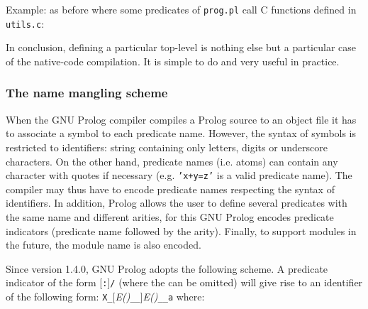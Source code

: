 Example: as before where some predicates of \texttt{prog.pl} call C functions
defined in \texttt{utils.c}:


In conclusion, defining a particular top-level is nothing else but a
particular case of the native-code compilation. It is simple to do and very
useful in practice.

\subsubsection{The name mangling scheme}
\label{Name-mangling-scheme}

When the GNU Prolog compiler compiles a Prolog source to an object file it
has to associate a symbol to each predicate name. However, the syntax of
symbols is restricted to identifiers: string containing only letters, digits
or underscore characters. On the other hand, predicate names (i.e. atoms) can
contain any character with quotes if necessary (e.g. \texttt{'x+y=z'} is a
valid predicate name). The compiler may thus have to encode predicate names
respecting the syntax of identifiers. In addition, Prolog allows the user to
define several predicates with the same name and different arities, for this
GNU Prolog encodes predicate indicators (predicate name followed by the
arity). Finally, to support modules in the future, the module name is also
encoded.

Since version 1.4.0, GNU Prolog adopts the following 
scheme. A predicate indicator of the form
[\texttt{:}]\texttt{/} (where
the  can be omitted) will give rise to an identifier of the
following form:
\texttt{X}\texttt{\_}[\textit{E()}\texttt{\_\_}]\textit{E()}\texttt{\_\_a}
where:

